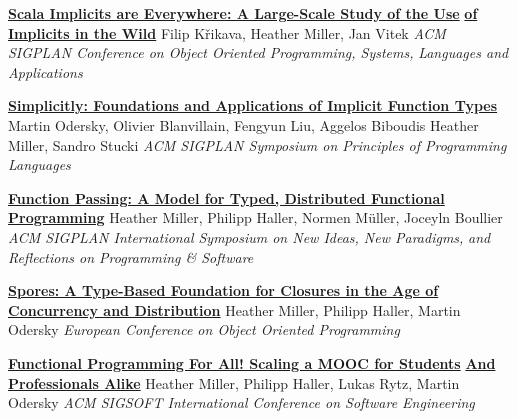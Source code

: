 \documentclass[9pt]{article}
\begin{document}
\noindent\href{https://arxiv.org/pdf/1908.07883}{\bf Scala Implicits are Everywhere: A Large-Scale Study of the Use}\vspace{-0.03in}
\newline\noindent\href{https://arxiv.org/pdf/1908.07883}{\bf of Implicits in the Wild}
\newline\noindent Filip K\v{r}ikava, Heather Miller, Jan Vitek
\newline\noindent\emph{ACM SIGPLAN Conference on Object Oriented Programming, Systems,}
\newline\noindent\emph{Languages and Applications}
\bigskip

\noindent\href{https://infoscience.epfl.ch/record/229878}{\bf Simplicitly: Foundations and Applications of Implicit Function Types}
\newline\noindent Martin Odersky, Olivier Blanvillain, Fengyun Liu, Aggelos Biboudis
\newline\noindent Heather Miller, Sandro Stucki
\newline\noindent\emph{ACM SIGPLAN Symposium on Principles of Programming Languages}
\bigskip

\noindent\href{https://infoscience.epfl.ch/record/205822}{\bf Function Passing: A Model for Typed, Distributed Functional}\vspace{-0.03in}
\newline\noindent\href{https://infoscience.epfl.ch/record/205822}{\bf Programming}
\newline\noindent Heather Miller, Philipp Haller, Normen M\"{u}ller, Joceyln Boullier
\newline\noindent\emph{ACM SIGPLAN International Symposium on New Ideas, New Paradigms,}
\newline\noindent\emph{and Reflections on Programming \& Software}
\bigskip

\noindent\href{http://infoscience.epfl.ch/record/191239}{\bf Spores: A Type-Based Foundation for Closures in the Age of}\vspace{-0.03in}
\newline\noindent\href{http://infoscience.epfl.ch/record/191239}{\bf Concurrency and Distribution}
\newline\noindent Heather Miller, Philipp Haller, Martin Odersky
\newline\noindent\emph{European Conference on Object Oriented Programming}
\bigskip

\noindent\href{http://infoscience.epfl.ch/record/190022}{\bf Functional Programming For All! Scaling a MOOC for Students}\vspace{-0.03in}
\newline\noindent\href{http://infoscience.epfl.ch/record/190022}{\bf And Professionals Alike}
\newline\noindent Heather Miller, Philipp Haller, Lukas Rytz, Martin Odersky
\newline\noindent\emph{ACM SIGSOFT International Conference on Software Engineering}
\bigskip
\end{document}
